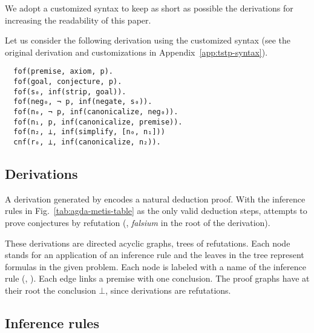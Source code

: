 \documentclass[../main.tex]{subfiles}
\begin{document}
\begin{notation}

We adopt a customized \TSTP syntax to keep as short as possible the
\Metis derivations for increasing the readability of this paper.

\begin{myexamplenum}
\label{fig:metis-example-tree}

Let us consider the following \TSTP derivation using
the customized \TSTP syntax (see the original \TSTP derivation and
customizations in Appendix~\ref{app:tstp-syntax}).

\begin{verbatim}
  fof(premise, axiom, p).
  fof(goal, conjecture, p).
  fof(s₀, inf(strip, goal)).
  fof(neg₀, ¬ p, inf(negate, s₀)).
  fof(n₀, ¬ p, inf(canonicalize, neg₀)).
  fof(n₁, p, inf(canonicalize, premise)).
  fof(n₂, ⊥, inf(simplify, [n₀, n₁]))
  cnf(r₀, ⊥, inf(canonicalize, n₂)).
\end{verbatim}

\end{myexamplenum}
\end{notation}


\subsection{Derivations}
\label{ssec:metis-proofs}

A derivation generated by \Metis encodes a natural
deduction proof. With the inference rules in
Fig.~\ref{tab:agda-metis-table}
as the only valid deduction steps, \Metis
attempts to prove conjectures by refutation (\ie,
\emph{falsium} in the root of the \TSTP derivation).

These derivations are directed acyclic graphs, trees of refutations.
Each node stands for an application of an inference rule and the
leaves in the tree represent formulas in the given problem. Each node
is labeled with a name of the inference rule (\eg, \canonicalize).
Each edge links a premise with one conclusion. The proof graphs have
at their root the conclusion $⊥$, since \Metis derivations are
refutations.

\subsection{Inference rules}
\label{ssec:metis-inferences-rules}
\end{document}

